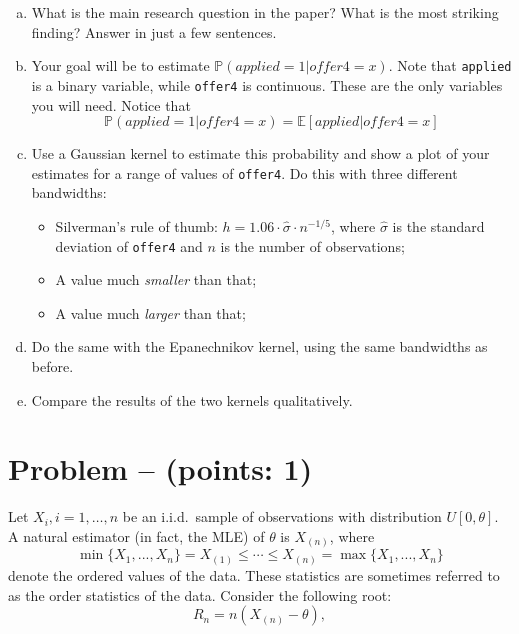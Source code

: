 \documentclass[11pt]{article}
\theoremstyle{definition}
\newcounter{problem}
\renewcommand{\theproblem}{\arabic{problem}}
\newcommand{\problem}[1]{
	\stepcounter{problem}
	\section*{Problem \theproblem{} -- (points: #1)}
}
\begin{document}
\begin{enumerate}[a)]
	\item What is the main research question in the paper? What is the most striking finding? Answer in just a few sentences.
	\item Your goal will be to estimate $\mathbb{P}(applied = 1 | offer4 = x)$. Note that \texttt{applied} is a binary variable, while \texttt{offer4} is continuous. These are the only variables you will need. Notice that 
	\[
	\mathbb{P}(applied = 1 | offer4 = x) = \mathbb{E}[applied | offer4 = x]
	\]

	\item Use a Gaussian kernel to estimate this probability and show a plot of your estimates for a range of values of \texttt{offer4}. Do this with three different bandwidths: 
	\begin{itemize}
		\item Silverman’s rule of thumb: $h = 1.06 \cdot \hat{\sigma} \cdot n^{-1/5}$, where $\hat{\sigma}$ is the standard deviation of \texttt{offer4} and $n$ is the number of observations;
		\item A value much \textit{smaller} than that;
		\item A value much \textit{larger} than that;
	\end{itemize}
	\item Do the same with the Epanechnikov kernel, using the same bandwidths as before.
	\item Compare the results of the two kernels qualitatively.
\end{enumerate}

\problem{1}
Let $X_i, i = 1, \dots, n$ be an i.i.d.\ sample of observations with distribution $U[0, \theta]$. A natural estimator (in fact, the MLE) of $\theta$ is $X_{(n)}$, where
\[
\min\{X_1, ..., X_n\} =  X_{(1)} \leq \cdots \leq X_{(n)} = \max\{X_1, ..., X_n\}
\]
denote the ordered values of the data. These statistics are sometimes referred to as the order statistics of the data. Consider the following root:
\[
R_n = n(X_{(n)} - \theta),
\]
\end{document}
